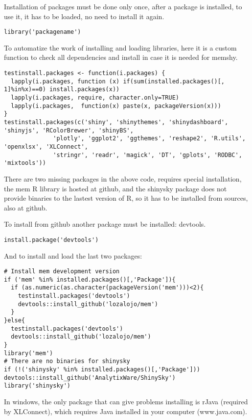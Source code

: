 \documentclass[10pt,a4paper]{memoir}
\begin{document}
Installation of packages must be done only once, after a package is installed, to use it, it has to be loaded, no need to install it again.

\begin{lstlisting}
library('packagename')
\end{lstlisting}

To automatize the work of installing and loading libraries, here it is a custom function to check all dependencies and install in case it is needed for memshy.

\begin{lstlisting}
testinstall.packages <- function(i.packages) {
  lapply(i.packages, function (x) if(sum(installed.packages()[, 1]%in%x)==0) install.packages(x))
  lapply(i.packages, require, character.only=TRUE)
  lapply(i.packages,  function(x) paste(x, packageVersion(x)))
}
testinstall.packages(c('shiny', 'shinythemes', 'shinydashboard', 'shinyjs', 'RColorBrewer', 'shinyBS',
              'plotly', 'ggplot2', 'ggthemes', 'reshape2', 'R.utils', 'openxlsx', 'XLConnect',
              'stringr', 'readr', 'magick', 'DT', 'gplots', 'RODBC', 'mixtools'))
\end{lstlisting}

There are two missing packages in the above code, requires special installation, the mem R library is hosted at github, and the shinysky package does not provide binaries to the lastest version of R, so it has to be installed from sources, also at github.

To install from github another package must be installed: devtools.

\begin{lstlisting}
install.package('devtools')
\end{lstlisting}

And to install and load the last two packages:

\begin{lstlisting}
# Install mem development version
if ('mem' %in% installed.packages()[,'Package']){
  if (as.numeric(as.character(packageVersion('mem')))<2){
    testinstall.packages('devtools')
    devtools::install_github('lozalojo/mem')
  }  
}else{
  testinstall.packages('devtools')
  devtools::install_github('lozalojo/mem')
}
library('mem')
# There are no binaries for shinysky
if (!('shinysky' %in% installed.packages()[,'Package'])) devtools::install_github('AnalytixWare/ShinySky')
library('shinysky')
\end{lstlisting}

In windows, the only package that can give problems installing is rJava (required by XLConnect), which requires Java installed in your computer (www.java.com).
\end{document}

